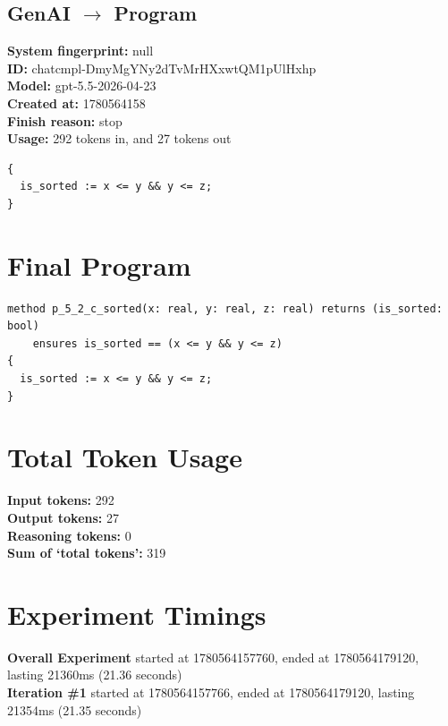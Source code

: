 \documentclass{article}
\begin{document}
\subsection*{GenAI $\rightarrow$ Program}
\textbf{System fingerprint: }null
\\\textbf{ID: }chatcmpl-DmyMgYNy2dTvMrHXxwtQM1pUlHxhp
\\\textbf{Model: }gpt-5.5-2026-04-23
\\\textbf{Created at: }1780564158
\\\textbf{Finish reason: }stop
\\\textbf{Usage: }292 tokens in, and 27 tokens out
\begin{lstlisting}
{
  is_sorted := x <= y && y <= z;
}
\end{lstlisting}
\section*{Final Program}
\begin{lstlisting}
method p_5_2_c_sorted(x: real, y: real, z: real) returns (is_sorted: bool)
	ensures is_sorted == (x <= y && y <= z)
{
  is_sorted := x <= y && y <= z;
}
\end{lstlisting}
\section*{Total Token Usage}
\textbf{Input tokens: }292
\\\textbf{Output tokens: }27
\\\textbf{Reasoning tokens: }0
\\\textbf{Sum of `total tokens': }319
\section*{Experiment Timings}
\textbf{Overall Experiment} started at 1780564157760, ended at 1780564179120, lasting 21360ms (21.36 seconds)
\\\textbf{Iteration \#1} started at 1780564157766, ended at 1780564179120, lasting 21354ms (21.35 seconds)
\end{document}
